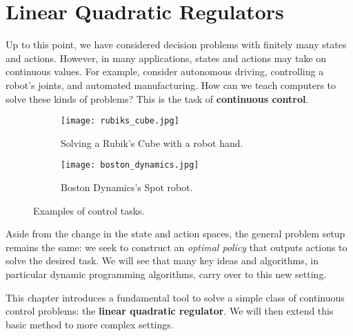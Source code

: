 \documentclass[\main/main]{subfiles}
\begin{document}
\tableofcontents

\chapter[LQR]{Linear Quadratic Regulators}

Up to this point, we have considered decision problems with finitely many states and actions.
However, in many applications, states and actions may take on continuous values.
For example, consider autonomous driving, controlling a robot's joints, and automated manufacturing.
How can we teach computers to solve these kinds of problems? This is the task of \textbf{continuous control}.

\begin{figure}[h]
    \centering
    \begin{subfigure}[b]{0.45\textwidth}
        \texttt{[image: rubiks\_cube.jpg]}
        \caption{Solving a Rubik's Cube with a robot hand.}
        \label{fig:rubik\st_cube}
    \end{subfigure}
    \hfill
    \begin{subfigure}[b]{0.45\textwidth}
        \texttt{[image: boston\_dynamics.jpg]}
        \caption{Boston Dynamics's Spot robot.}
        \label{fig:robot_hand}
    \end{subfigure}
    \caption{Examples of control tasks.}
    \label{fig:control_examples}
\end{figure}

Aside from the change in the state and action spaces, the general problem setup remains the same: we seek to construct an \emph{optimal policy} that outputs actions to solve the desired task. We will see that many key ideas and algorithms, in particular dynamic programming algorithms, carry over to this new setting.

This chapter introduces a fundamental tool to solve a simple class of continuous control problems: the \textbf{linear quadratic regulator}. We will then extend this basic method to more complex settings.
\end{document}
